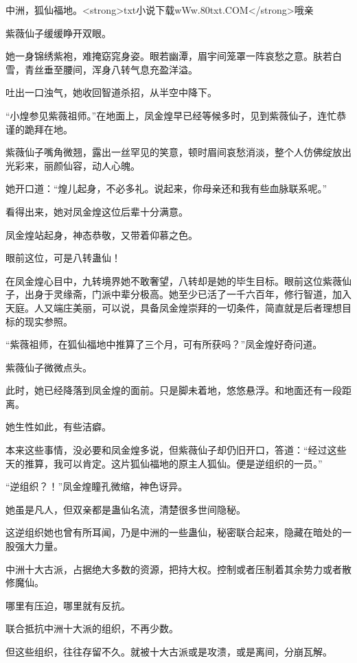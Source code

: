 
\begin{this_body}

中洲，狐仙福地。<strong>txt小说下载wWw.80txt.COM</strong>哦亲

紫薇仙子缓缓睁开双眼。

她一身锦绣紫袍，难掩窈窕身姿。眼若幽潭，眉宇间笼罩一阵哀愁之意。肤若白雪，青丝垂至腰间，浑身八转气息充盈洋溢。

吐出一口浊气，她收回智道杀招，从半空中降下。

“小煌参见紫薇祖师。”在地面上，凤金煌早已经等候多时，见到紫薇仙子，连忙恭谨的跪拜在地。

紫薇仙子嘴角微翘，露出一丝罕见的笑意，顿时眉间哀愁消淡，整个人仿佛绽放出光彩来，丽颜仙容，动人心魄。

她开口道：“煌儿起身，不必多礼。说起来，你母亲还和我有些血脉联系呢。”

看得出来，她对凤金煌这位后辈十分满意。

凤金煌站起身，神态恭敬，又带着仰慕之色。

眼前这位，可是八转蛊仙！

在凤金煌心目中，九转境界她不敢奢望，八转却是她的毕生目标。眼前这位紫薇仙子，出身于灵缘斋，门派中辈分极高。她至少已活了一千六百年，修行智道，加入天庭。人又端庄美丽，可以说，具备凤金煌崇拜的一切条件，简直就是后者理想目标的现实参照。

“紫薇祖师，在狐仙福地中推算了三个月，可有所获吗？”凤金煌好奇问道。

紫薇仙子微微点头。

此时，她已经降落到凤金煌的面前。只是脚未着地，悠悠悬浮。和地面还有一段距离。

她生性如此，有些洁癖。

本来这些事情，没必要和凤金煌多说，但紫薇仙子却仍旧开口，答道：“经过这些天的推算，我可以肯定。这片狐仙福地的原主人狐仙。便是逆组织的一员。”

“逆组织？！”凤金煌瞳孔微缩，神色讶异。

她虽是凡人，但双亲都是蛊仙名流，清楚很多世间隐秘。

这逆组织她也曾有所耳闻，乃是中洲的一些蛊仙，秘密联合起来，隐藏在暗处的一股强大力量。

中洲十大古派，占据绝大多数的资源，把持大权。控制或者压制着其余势力或者散修魔仙。

哪里有压迫，哪里就有反抗。

联合抵抗中洲十大派的组织，不再少数。

但这些组织，往往存留不久。就被十大古派或是攻溃，或是离间，分崩瓦解。


\end{this_body}
